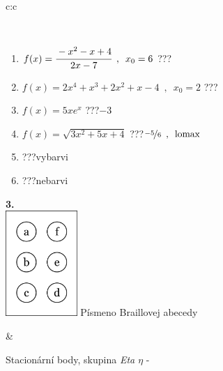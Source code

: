 \documentclass[10pt]{report}
\begin{document}
\begin{tabular}{c:c}
\begin{minipage}[c][104.5mm][t]{0.5\linewidth}
\begin{center}
\begin{minipage}{0.95\linewidth}
\begin{center}
\end{center}
\end{minipage}
\\[1mm]
\begin{minipage}{0.79\linewidth}
\begin{center}
\begin{varwidth}{\linewidth}
\begin{enumerate}
\normalsize
\item $f(x)=\cfrac{-x^2-x+4}{2x-7}\enspace , \enspace x_0=6$\quad \dotfill\; ???\;\dotfill \quad {}
\item $f(x)=2x^4+x^3+2x^2+x-4\enspace , \enspace x_0=2$\quad \dotfill\; ???\;\dotfill \quad {}
\item $f(x)=5xe^{x}$\quad \dotfill\; ???\;\dotfill \quad $-3$
\item $f(x)=\sqrt{3x^2+5x+4}$\quad \dotfill\; ???\;\dotfill \quad $\nicefrac{-5}{6}\enspace , \enspace\mathrm{lomax}$
\item \quad \dotfill\; ???\;\dotfill \quad vybarvi
\item \quad \dotfill\; ???\;\dotfill \quad nebarvi
\end{enumerate}
\end{varwidth}
\end{center}
\end{minipage}
\begin{minipage}{0.20\linewidth}
\begin{center}
{\Huge\bfseries 3.} \\[2mm]
\includegraphics[height=40mm]{../images/braille.png}
{\small Písmeno Braillovej abecedy}
\end{center}
\end{minipage}
\end{center}
\end{minipage}
&
\begin{minipage}[c][104.5mm][t]{0.5\linewidth}
\begin{center}
\vspace{7mm}
{\huge Stacionární body, skupina \textit{Eta $\eta$} -}\\[5mm]

\end{center}
\end{minipage}
\end{tabular}
\end{document}
